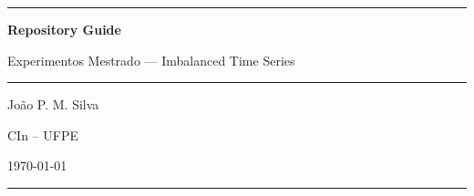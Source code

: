 \documentclass[11pt, a4paper]{article}
\begin{document}
\begin{titlepage}
    \centering
    \vspace*{3cm}
    {\color{ClaudeOrange}\rule{\linewidth}{1.5pt}}\par
    \vspace{1.5cm}
    {\Huge\bfseries\color{ClaudeDark} Repository Guide\par}
    \vspace{0.5cm}
    {\large\color{ClaudeMuted} Experimentos Mestrado — Imbalanced Time Series\par}
    \vspace{1.5cm}
    {\color{ClaudeOrange}\rule{\linewidth}{0.5pt}}\par
    \vspace{2cm}
    {\large Jo\~{a}o P. M. Silva\par}
    \vspace{0.3cm}
    {\color{ClaudeMuted} CIn -- UFPE\par}
    \vspace{3cm}
    \vfill
    {\color{ClaudeMuted}\today\par}
    \vspace{0.5cm}
    {\color{ClaudeOrange}\rule{\linewidth}{0.5pt}}\par
\end{titlepage}

\newpage

\tableofcontents
\newpage













\appendix

\end{document}
